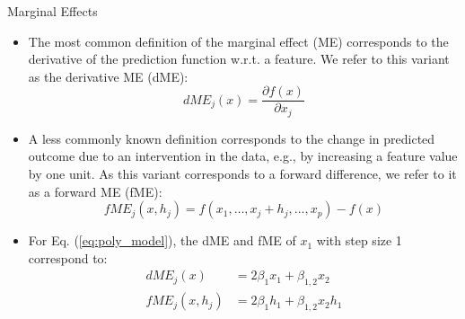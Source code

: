 \documentclass[11pt,compress,t,notes=noshow, xcolor=table]{beamer}
\begin{document}
\begin{vbframe}{Marginal Effects}

\begin{itemize}
\setlength\itemsep{2em}
\item
The most common definition of the marginal effect (ME) corresponds to the derivative of the prediction function w.r.t. a feature. We refer to this variant as the derivative ME (dME):
\begin{equation*}
dME_j(x) = \frac{\partial f(x)}{\partial x_j}
\end{equation*}
\item 
A less commonly known definition corresponds to the change in predicted outcome due to an intervention in the data, e.g., by increasing a feature value by one unit. As this variant corresponds to a forward difference, we refer to it as a forward ME (fME):
\begin{equation*}
fME_j(x, h_j) = f(x_1, \dots, x_j + h_j, \dots, x_p) - f(x)
\end{equation*}
\item For Eq. (\ref{eq:poly_model}), the dME and fME of $x_1$ with step size 1 correspond to:
\begin{align*}
dME_j(x) &= 2\beta_1 x_1 +  \beta_{1, 2} x_2 \\
fME_j(x, h_j) &= 2\beta_1 h_1 +  \beta_{1, 2} x_2 h_1
\end{align*}
\end{itemize}
\end{vbframe}





\endlecture
\end{document}
